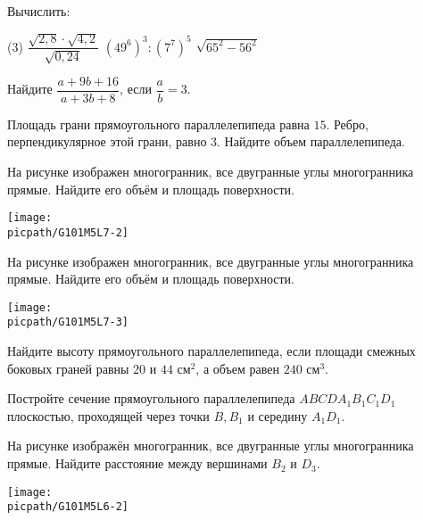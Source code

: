 \begin{exam}
	\begin{listofex}
		\item Вычислить:
		\begin{tasks}(3)
			\task \( \dfrac{\sqrt{2,8}\cdot\sqrt{4,2}}{\sqrt{0,24}} \)
			\task \( (49^6)^3 : (7^7)^5 \)
			\task \( \sqrt{65^2-56^2} \)
		\end{tasks}
		\item Найдите \(\dfrac{a+9b+16}{a+3b+8}\), если \(\dfrac{a}{b}=3\).
		\item Площадь грани прямоугольного параллелепипеда равна \( 15 \). Ребро, перпендикулярное этой грани, равно \(3\). Найдите объем параллелепипеда.
		\item 
		\begin{minipage}[t]{\bodywidth}
			На рисунке изображен многогранник, все двугранные углы многогранника прямые. Найдите его объём и площадь поверхности.
		\end{minipage}
		\hspace{0.02\linewidth}
		\begin{minipage}[t]{\picwidth}
			\texttt{[image: \\picpath/G101M5L7-2]}
		\end{minipage}
		\item 
		\begin{minipage}[t]{\bodywidth}
			На рисунке изображен многогранник, все двугранные углы многогранника прямые. Найдите его объём и площадь поверхности.
		\end{minipage}
		\hspace{0.02\linewidth}
		\begin{minipage}[t]{\picwidth}
			\texttt{[image: \\picpath/G101M5L7-3]}
		\end{minipage}
		\item Найдите высоту прямоугольного параллелепипеда, если площади смежных боковых граней равны \(20\) и \(44\) см\(^2\), а объем равен \(240\) см\(^3\).
		\item Постройте сечение прямоугольного параллелепипеда \(ABCDA_1B_1C_1D_1\) плоскостью, проходящей через точки \(B, B_1\) и середину \(A_1D_1\).
		\item 
		\begin{minipage}[t]{\bodywidth}
			На рисунке изображён многогранник, все двугранные углы многогранника прямые. Найдите расстояние между вершинами \(B_2\) и \(D_3\).
		\end{minipage}
		\hspace{0.02\linewidth}
		\begin{minipage}[t]{\picwidth}
			\texttt{[image: \\picpath/G101M5L6-2]}
		\end{minipage}
		
	\end{listofex}
\end{exam}
